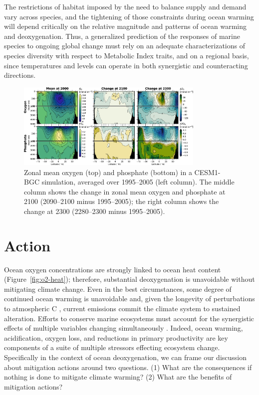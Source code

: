 \documentclass{report_chapter}
\begin{document}
The restrictions of habitat imposed by the need to balance \OO{} supply and demand vary across species, and the tightening of those constraints during ocean warming will depend critically on the relative magnitude and patterns of ocean warming and deoxygenation.
Thus, a generalized prediction of the responses of marine species to ongoing global change must rely on an adequate characterizations of species diversity with respect to Metabolic Index traits, and on a regional basis, since temperatures and \OO{} levels can operate in both synergistic and counteracting directions.


\begin{figure}
\centering
\includegraphics[width=0.8\textwidth]{global-zonal-mean-2300.png}
\caption{Zonal mean oxygen (top) and phosphate (bottom) in a CESM1-BGC simulation, averaged over 1995--2005 (left column).
The middle column shows the change in zonal mean oxygen and phosphate at 2100 (2090--2100 minus 1995--2005); the right column shows the change at 2300 (2280--2300 minus 1995--2005).}
\label{fig:2300}
\end{figure}

\section{Action}

Ocean oxygen concentrations are strongly linked to ocean heat content (Figure~\ref{fig:o2-heat}); therefore, substantial deoxygenation is unavoidable without mitigating climate change.
Even in the best circumstances, some degree of continued ocean warming is unavoidable and, given the longevity of perturbations to atmospheric C\OO{} \citep{Archer-Kheshgi-etal-1997}, current emissions commit the climate system to sustained alteration.
Efforts to conserve marine ecosystems must account for the synergistic effects of multiple variables changing simultaneously \citep[e.g.,][]{Brewer-Peltzer-2009,Portner-2010,Deutsch-Ferrel-etal-2015,Boyd-Lennartz-etal-2014}.
Indeed, ocean warming, acidification, oxygen loss, and reductions in primary productivity are key components of a suite of multiple stressors effecting ecosystem change.
Specifically in the context of ocean deoxygenation, we can frame our discussion about mitigation actions around two questions.
(1) What are the consequences if nothing is done to mitigate climate warming?
(2) What are the benefits of mitigation actions?
\end{document}

